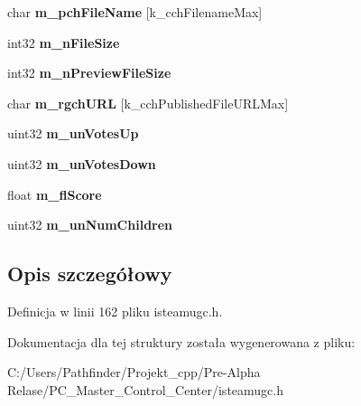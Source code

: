 \begin{DoxyCompactItemize}
\item 
\mbox{\label{struct_steam_u_g_c_details__t_aff754eedde6ce8f1ebbcf94c32328946}} 
char {\bfseries m\+\_\+pch\+File\+Name} \mbox{[}k\+\_\+cch\+Filename\+Max\mbox{]}
\item 
\mbox{\label{struct_steam_u_g_c_details__t_a1889aedab86b30ea6b1be103387d465f}} 
int32 {\bfseries m\+\_\+n\+File\+Size}
\item 
\mbox{\label{struct_steam_u_g_c_details__t_a32a19a36c0f0a19a90371f1b830c04ca}} 
int32 {\bfseries m\+\_\+n\+Preview\+File\+Size}
\item 
\mbox{\label{struct_steam_u_g_c_details__t_a4763e499ea2f9762562fe3c73cf49fa1}} 
char {\bfseries m\+\_\+rgch\+U\+RL} \mbox{[}k\+\_\+cch\+Published\+File\+U\+R\+L\+Max\mbox{]}
\item 
\mbox{\label{struct_steam_u_g_c_details__t_a033649aebaa34c333b0acb3c4166e04a}} 
uint32 {\bfseries m\+\_\+un\+Votes\+Up}
\item 
\mbox{\label{struct_steam_u_g_c_details__t_aecfa3981942d1bf472c56814f0e1bf17}} 
uint32 {\bfseries m\+\_\+un\+Votes\+Down}
\item 
\mbox{\label{struct_steam_u_g_c_details__t_a238c83e2101c31de76e89195d81ae0a8}} 
float {\bfseries m\+\_\+fl\+Score}
\item 
\mbox{\label{struct_steam_u_g_c_details__t_a6e742b2342bed5aada102eb9d4ed446e}} 
uint32 {\bfseries m\+\_\+un\+Num\+Children}
\end{DoxyCompactItemize}


\subsection{Opis szczegółowy}


Definicja w linii 162 pliku isteamugc.\+h.



Dokumentacja dla tej struktury została wygenerowana z pliku\+:\begin{DoxyCompactItemize}
\item 
C\+:/\+Users/\+Pathfinder/\+Projekt\+\_\+cpp/\+Pre-\/\+Alpha Relase/\+P\+C\+\_\+\+Master\+\_\+\+Control\+\_\+\+Center/isteamugc.\+h\end{DoxyCompactItemize}
